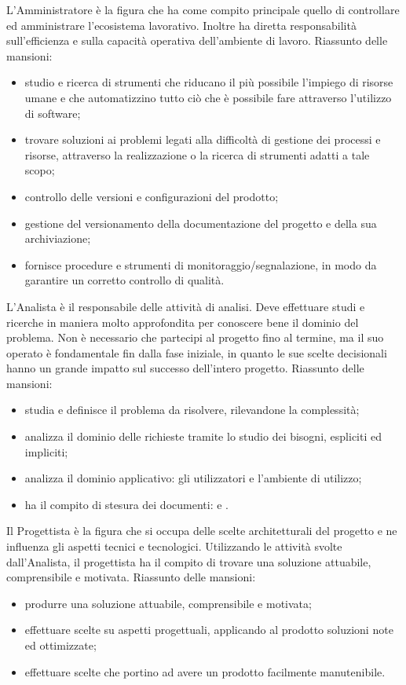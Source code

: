 			L'Amministratore è la figura che ha come compito principale quello di controllare ed amministrare l'ecosistema lavorativo. Inoltre ha diretta responsabilità sull'efficienza e sulla capacità operativa dell'ambiente di lavoro.
			Riassunto delle mansioni:
			\begin{itemize}
				\item studio e ricerca di strumenti che riducano il più possibile l'impiego di risorse umane e che automatizzino tutto ciò che è possibile fare attraverso l'utilizzo di software;
				\item trovare soluzioni ai problemi legati alla difficoltà di gestione dei processi e risorse, attraverso la realizzazione o la ricerca di strumenti adatti a tale scopo;
				\item controllo delle versioni e configurazioni del prodotto;
				\item gestione del versionamento della documentazione del progetto e della sua archiviazione;
				\item fornisce procedure e strumenti di monitoraggio/segnalazione, in modo da garantire un corretto controllo di qualità.
			\end{itemize}
		
			L'Analista è il responsabile delle attività di analisi. Deve effettuare studi e ricerche in maniera molto approfondita per conoscere bene il dominio del problema. Non è necessario che partecipi al progetto fino al termine, ma il suo operato è fondamentale fin dalla fase iniziale, in quanto le sue scelte decisionali hanno un grande impatto sul successo dell'intero progetto.
			Riassunto delle mansioni:
			\begin{itemize}
				\item studia e definisce il problema da risolvere, rilevandone la complessità;
				\item analizza il dominio delle richieste tramite lo studio dei bisogni, espliciti ed impliciti;
				\item analizza il dominio applicativo: gli utilizzatori e l'ambiente di utilizzo;
				\item ha il compito di stesura dei documenti: \AdR{} e \SdF{}.
			\end{itemize}
		
			Il Progettista è la figura che si occupa delle scelte architetturali del progetto e ne influenza gli aspetti tecnici e tecnologici. Utilizzando le attività svolte dall'Analista, il progettista ha il compito di trovare una soluzione attuabile, comprensibile e motivata.
			Riassunto delle mansioni:
			\begin{itemize}
				\item produrre una soluzione attuabile, comprensibile e motivata;
				\item effettuare scelte su aspetti progettuali, applicando al prodotto soluzioni note ed ottimizzate;
				\item effettuare scelte che portino ad avere un prodotto facilmente manutenibile.
			\end{itemize}
		
